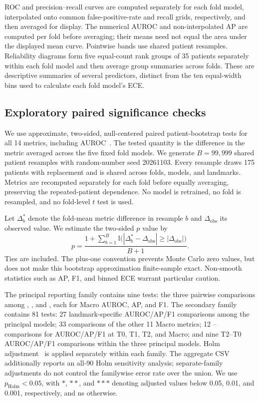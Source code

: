 ROC and precision--recall curves are computed separately for each fold model, interpolated onto common false-positive-rate and recall grids, respectively, and then averaged for display. The numerical AUROC and non-interpolated AP are computed per fold before averaging; their means need not equal the area under the displayed mean curve. Pointwise bands use shared patient resamples. Reliability diagrams form five equal-count rank groups of 35 patients separately within each fold model and then average group summaries across folds. These are descriptive summaries of several predictors, distinct from the ten equal-width bins used to calculate each fold model's ECE.

\subsection{Exploratory paired significance checks}
We use approximate, two-sided, null-centered paired patient-bootstrap tests for all 14 metrics, including AUROC~\citep{davison1997}. The tested quantity is the difference in the metric averaged across the five fixed fold models. We generate $B=99{,}999$ shared patient resamples with random-number seed 20261103. Every resample draws 175 patients with replacement and is shared across folds, models, and landmarks. Metrics are recomputed separately for each fold before equally averaging, preserving the repeated-patient dependence. No model is retrained, no fold is resampled, and no fold-level $t$ test is used.

Let $\Delta_b^*$ denote the fold-mean metric difference in resample $b$ and $\Delta_{\mathrm{obs}}$ its observed value. We estimate the two-sided $p$ value by
\begin{equation}
 p=\frac{1+\sum_{b=1}^{B}\mathbb{I}\bigl(|\Delta_b^*-\Delta_{\mathrm{obs}}|\geq|\Delta_{\mathrm{obs}}|\bigr)}{B+1}.
\end{equation}
Ties are included. The plus-one convention prevents Monte Carlo zero values, but does not make this bootstrap approximation finite-sample exact. Non-smooth statistics such as AP, F1, and binned ECE warrant particular caution.

The principal reporting family contains nine tests: the three pairwise comparisons among \nojepa{}, \direct{}, and \fullmodel{}, each for Macro AUROC, AP, and F1. The secondary family contains 81 tests: 27 landmark-specific AUROC/AP/F1 comparisons among the principal models; 33 comparisons of the other 11 Macro metrics; 12 \fullmodel{}--\meanmodel{} comparisons for AUROC/AP/F1 at T0, T1, T2, and Macro; and nine T2--T0 AUROC/AP/F1 comparisons within the three principal models. Holm adjustment~\citep{holm1979} is applied separately within each family. The aggregate CSV additionally reports an all-90 Holm sensitivity analysis; separate-family adjustments do not control the familywise error rate over the union. We use $p_{\mathrm{Holm}}<0.05$, with $*$, $**$, and $***$ denoting adjusted values below 0.05, 0.01, and 0.001, respectively, and ns otherwise.

